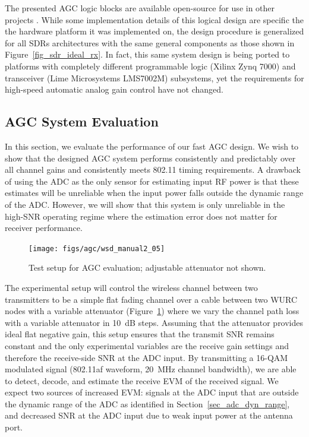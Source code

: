 	The presented \ac{AGC} logic blocks are available open-source for use in other projects \cite{guerra2012pcores}.
	While some implementation details of this logical design are specific the the hardware platform it was implemented on, the design procedure is generalized for all \acp{SDR} architectures with the same general components as those shown in Figure~\ref{fig_sdr_ideal_rx}.
	In fact, this same system design is being ported to platforms with completely different programmable logic (Xilinx Zynq 7000) and transceiver (Lime Microsystems LMS7002M) subsystems, yet the requirements for high-speed automatic analog gain control have not changed.

\subsection{AGC System Evaluation}
\label{sec_agc_system_eval}

	In this section, we evaluate the performance of our fast \ac{AGC} design.
	We wish to show that the designed \ac{AGC} system performs consistently and predictably over all channel gains and consistently meets 802.11 timing requirements.
	A drawback of using the \ac{ADC} as the only sensor for estimating input RF power is that these estimates will be unreliable when the input power falls outside the dynamic range of the \ac{ADC}.
	However, we will show that this system is only unreliable in the high-SNR operating regime where the estimation error does not matter for receiver performance.

\begin{figure}[t]
\centering
  \texttt{[image: figs/agc/wsd\_manual2\_05]}   
    \caption{Test setup for AGC evaluation; adjustable attenuator not shown.}
		\label{fig_agc_test_setup}
\end{figure}

	The experimental setup will control the wireless channel between two transmitters to be a simple flat fading channel over a cable between two \ac{WURC} nodes with a variable attenuator (Figure~\ref{fig_agc_test_setup}) where we vary the channel path loss with a variable attenuator in 10~dB steps.
	Assuming that the attenuator provides ideal flat negative gain, this setup ensures that the transmit \ac{SNR} remains constant and the only experimental variables are the receive gain settings and therefore the receive-side \ac{SNR} at the \ac{ADC} input.
	By transmitting a 16-QAM modulated signal (802.11af waveform, 20~MHz channel bandwidth), we are able to detect, decode, and estimate the receive \ac{EVM} of the received signal.
	We expect two sources of increased \ac{EVM}: signals at the \ac{ADC} input that are outside the dynamic range of the \ac{ADC} as identified in Section~\ref{sec_adc_dyn_range}, and decreased \ac{SNR} at the \ac{ADC} input due to weak input power at the antenna port.
	

